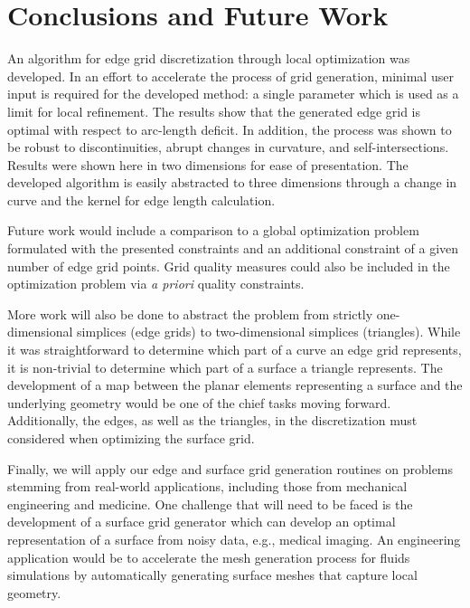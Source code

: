 \section{Conclusions and Future Work}
An algorithm for edge grid discretization through local optimization was 
developed. In an effort to accelerate the process of grid generation, 
minimal user input is required for the developed method: a single 
parameter which is used as a limit for local refinement. The results show 
that the generated edge grid is optimal with respect to arc-length 
deficit. In addition, the process was shown to be robust to 
discontinuities, abrupt changes in curvature, and self-intersections. 
Results were shown here in two dimensions for ease of presentation. The 
developed algorithm is easily abstracted to three dimensions through a 
change in curve and the kernel for edge length calculation.

Future work would include a comparison to a global optimization problem 
formulated with the presented constraints and an additional constraint of 
a given number of edge grid points. Grid quality measures could also be 
included in the optimization problem via {\it a priori} quality 
constraints.

More work will also be done to abstract the problem from strictly 
one-dimensional simplices (edge grids) to two-dimensional simplices 
(triangles). While it was straightforward to determine which part of a 
curve an edge grid represents, it is non-trivial to determine which part 
of a surface a triangle represents. The development of a map between the 
planar elements representing a surface and the underlying geometry would 
be one of the chief tasks moving forward. Additionally, the edges, as well 
as the triangles, in the discretization must considered when optimizing 
the surface grid.

Finally, we will apply our edge and surface grid generation routines on 
problems stemming from real-world applications, including those from 
mechanical engineering and medicine.  One challenge that will need to be 
faced is the development of a surface grid generator which can develop 
an optimal representation of a surface from noisy data, e.g., medical
imaging. An engineering application would be to accelerate the mesh generation
process for fluids simulations by automatically generating surface meshes
that capture local geometry.
